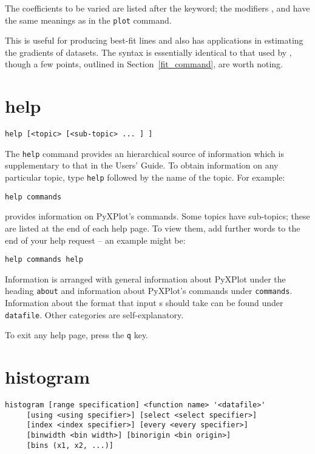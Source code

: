 \noindent The coefficients to be varied are listed after the 
 keyword; the modifiers ,  and
 have the same meanings as in the {\tt plot} command.

This is useful for producing best-fit lines and also has applications in
estimating the gradients of datasets.  The syntax is essentially identical to
that used by \gnuplot, though a few points, outlined in
Section~\ref{fit_command}, are worth noting.

\section{help}

\begin{verbatim}
help [<topic> [<sub-topic> ... ] ]
\end{verbatim}

The {\tt help} command provides an hierarchical source of information which
is supplementary to that in the Users' Guide.  To obtain information on any
particular topic, type {\tt help} followed by the name of the topic. For
example:

\begin{verbatim}
help commands
\end{verbatim}

\noindent provides information on PyXPlot's commands. Some topics have
sub-topics; these are listed at the end of each help page. To view them, add
further words to the end of your help request -- an example might be:

\begin{verbatim}
help commands help
\end{verbatim}

Information is arranged with general information about PyXPlot under the heading
{\tt about} and information about PyXPlot's commands under {\tt commands}.
Information about the format that input \datafile s should take can be found
under {\tt datafile}.  Other categories are self-explanatory.

To exit any help page, press the {\tt q} key.

\section{histogram}

\begin{verbatim}
histogram [range specification] <function name> '<datafile>' 
     [using <using specifier>] [select <select specifier>]
     [index <index specifier>] [every <every specifier>]
     [binwidth <bin width>] [binorigin <bin origin>]
     [bins (x1, x2, ...)]
\end{verbatim}

